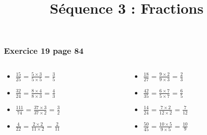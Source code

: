 \documentclass[xcolor={dvipsnames}]{beamer}
\title{Séquence 3 : Fractions}
\begin{document}


	

\begin{frame}
	\frametitle{Exercice 19 page 84}
	
	\begin{columns}
		\begin{column}{0.5\textwidth}
			\begin{huge}
				\begin{itemize}
					\setlength\itemsep{1em}
					\item $\frac{15}{25}$ = \pause $\frac{5 \times 3}{5 \times 5}$ = \pause $\frac{3}{5}$\pause
					
					\item $\frac{32}{24}$ = \pause $\frac{8 \times 4}{8 \times 3}$ = \pause $\frac{4}{3}$\pause
					
					\item $\frac{111}{74}$ = \pause $\frac{37 \times 3}{37 \times 2}$ = \pause $\frac{3}{2}$\pause
					
					\item $\frac{4}{22}$ = \pause $\frac{2 \times 2}{11 \times 2}$ = \pause $\frac{2}{11}$\pause
				\end{itemize}	
			\end{huge}
					
		\end{column}
	
	
		\begin{column}{0.5\textwidth}
			\begin{huge}
				\begin{itemize}
					\setlength\itemsep{1em}
					\item $\frac{18}{27}$ = \pause $\frac{9 \times 2}{9 \times 3}$ = \pause $\frac{2}{3}$\pause
					
					\item $\frac{42}{35}$ = \pause $\frac{6 \times 7}{5 \times 7}$ = \pause $\frac{6}{5}$\pause
					
					\item $\frac{14}{24}$ = \pause $\frac{7 \times 2}{12 \times 2}$ = \pause $\frac{7}{12}$\pause
					
					\item $\frac{50}{45}$ = \pause $\frac{10 \times 5}{9 \times 5}$ = \pause $\frac{10}{9}$
				\end{itemize}	
			\end{huge}
			
		\end{column}
	\end{columns}		
	
	
\end{frame}
\end{document}

